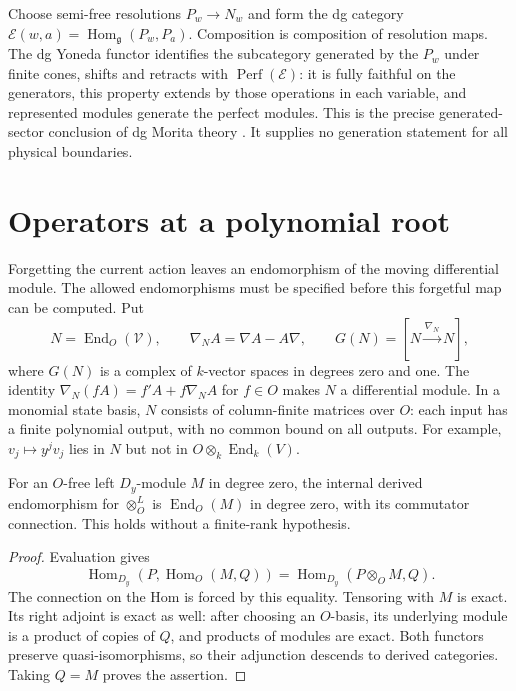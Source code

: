 Choose semi-free resolutions $P_w\to N_w$ and form the dg category
$\mathcal E(w,a)=\operatorname{Hom}_{\mathfrak g}(P_w,P_a)$.
Composition is composition of resolution maps. The dg Yoneda
functor identifies the subcategory generated by the $P_w$ under
finite cones, shifts and retracts with $\operatorname{Perf}(\mathcal E)$:
it is fully faithful on the generators, this property extends by
those operations in each variable, and represented modules generate
the perfect modules. This is the precise generated-sector conclusion
of dg Morita theory \cite[Theorem 3.8(b)]{KellerDG2006}.
It supplies no generation statement for all physical boundaries.

\section{Operators at a polynomial root}
\label{sec:vol2-polynomial-operators}

Forgetting the current action leaves an endomorphism of the moving
differential module. The allowed endomorphisms must be specified
before this forgetful map can be computed. Put
\begin{equation}\label{eq:vol2-affine-operators}
 N=\operatorname{End}_O(\mathcal V),\qquad
 \nabla_NA=\nabla A-A\nabla,\qquad
 G(N)=[N\xrightarrow{\nabla_N}N],
\end{equation}
where $G(N)$ is a complex of $k$-vector spaces in degrees zero and
one. The identity $\nabla_N(fA)=f'A+f\nabla_NA$ for $f\in O$
makes $N$ a differential module. In a monomial
state basis, $N$ consists of column-finite matrices over $O$: each
input has a finite polynomial output, with no common bound on all
outputs. For example, $v_j\mapsto y^jv_j$ lies in $N$ but not in
$O\otimes_k\operatorname{End}_k(V)$.

\begin{lemma}\label{lem:vol2-internal-operator}
For an $O$-free left $D_y$-module $M$ in degree zero, the internal
derived endomorphism for $\otimes_O^L$ is
$\operatorname{End}_O(M)$ in degree zero, with its commutator
connection. This holds without a finite-rank hypothesis.
\end{lemma}
\begin{proof}
Evaluation gives
\[
 \operatorname{Hom}_{D_y}(P,\operatorname{Hom}_O(M,Q))
 =\operatorname{Hom}_{D_y}(P\otimes_OM,Q).
\]
The connection on the Hom is forced by this equality. Tensoring
with $M$ is exact. Its right adjoint is exact as well: after choosing
an $O$-basis, its underlying module is a product of copies of $Q$,
and products of modules are exact. Both functors preserve
quasi-isomorphisms, so their adjunction descends to derived
categories. Taking $Q=M$ proves the assertion.
\end{proof}

